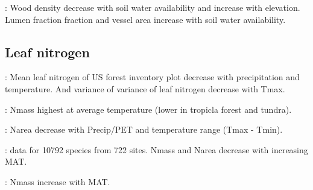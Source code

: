 \documentclass[a4paper,11pt]{article}
\begin{document}
\citet{Cornwell-2009}: Wood density decrease with soil water availability and increase with elevation. Lumen fraction fraction and vessel area increase with soil water availability.

\subsection{Leaf nitrogen}

\citet{Swenson-2010}: Mean leaf nitrogen of US forest inventory plot decrease with precipitation and temperature. And variance of variance of leaf nitrogen decrease with Tmax.

\citet{Reich-2004}: Nmass highest at average temperature (lower in tropicla forest and tundra).

\citet{Maire-2015}: Narea decrease with Precip/PET and temperature range (Tmax - Tmin).

\citet{Moles-2014}: data for 10792 species from 722 sites. Nmass and Narea decrease with increasing MAT.

\citet{Ordonez-2009}: Nmass increase with MAT.

\clearpage



\end{document}
